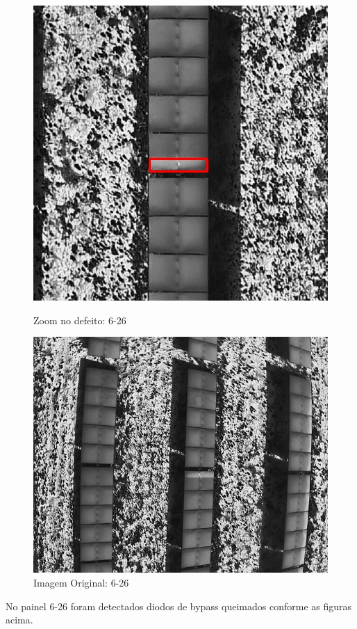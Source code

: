 \documentclass[dvipsnames]{article}%
\begin{document}
\begin{figure}[h!]
\begin{minipage}{0.31\linewidth}%
\centering%
\centering%
\includegraphics[width=\linewidth]{report_images/faultydiodes_6-26_cropped.jpg}%
\caption{Zoom no defeito: 6-26}%
\end{minipage}%
\hfill%
\begin{minipage}{0.31\linewidth}%
\centering%
\centering%
\includegraphics[width=\linewidth]{report_images/faultydiodes_6-26.jpg}%
\caption{Imagem Original: 6-26}%
\end{minipage}%
\end{figure}

%
\FloatBarrier%
No painel 6{-}26 foram detectados diodos de bypass queimados conforme as figuras acima.\newline%
%
\end{document}
